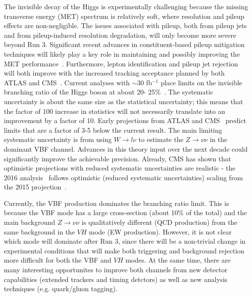 \documentclass[../report.tex]{subfiles}
\begin{document}
The invisible decay of the Higgs is experimentally challenging because the missing transverse energy (MET) spectrum is relatively soft, where resolution and pileup effects are non-negligible.  The issues associated with pileup, both from pileup jets and from pileup-induced resolution degradation, will only become more severe beyond Run 3.  Significant recent advances in constituent-based pileup mitigation techniques will likely play a key role in maintaining and possibly improving the MET performance~\cite{Cacciari:2014gra,Bertolini:2014bba,Berta:2014eza,Komiske:2017ubm}.  Furthermore, lepton identification and pileup jet rejection will both improve with the increased tracking acceptance planned by both ATLAS and CMS~\cite{Klein:2017nke,Collaboration:2283187,Collaboration:2283189,Collaboration:2293646,Collaboration:2017mtb,Collaboration:2285585}. Current analyses with $\sim 30$ fb$^{-1}$ place limits on the invisible branching ratio of the Higgs boson at about 20- 25\%~\cite{Khachatryan:2016whc,Aad:2015pla,Aaboud:2017bja,Aad:2015txa,Sirunyan:2018owy,Aaboud:2018sfi}.  The systematic uncertainty is about the same size as the statistical uncertainty; this means that the factor of 100 increase in statistics will not necessarily translate into an improvement by a factor of 10.  Early projections from ATLAS and CMS~\cite{CMS-PAS-FTR-16-002,ATL-PHYS-PUB-2013-014} predict limits that are a factor of 3-5 below the current result. The main limiting systematic uncertainty is from using $W\rightarrow l\nu$ to estimate the $Z\rightarrow \nu\nu$ in the dominant VBF channel. Advances in this theory input over the next decade could significantly improve the achievable precision. Already, CMS has shown that optimistic projections with reduced systematic uncertainties are realistic - the 2016 analysis~\cite{CMS:2018awd} follows optimistic (reduced systematic uncertainties) scaling from the 2015 projection~\cite{CMS-PAS-FTR-16-002}.

Currently, the VBF production dominates the branching ratio limit.  This is because the VBF mode has a large cross-section (about 10\% of the total) and the main background $Z\rightarrow\nu\nu$ is qualitatively different (QCD production) from the same background in the $VH$ mode (EW production).  However, it is not clear which mode will dominate after Run 3, since there will be a non-trivial change in experimental conditions that will make both triggering and background rejection more difficult for both the VBF and $VH$ modes.  At the same time, there are many interesting opportunites to improve both channels from new detector capabilities (extended trackers and timing detctors) as well as new analysis techniques (e.g. quark/gluon tagging).
\end{document}
